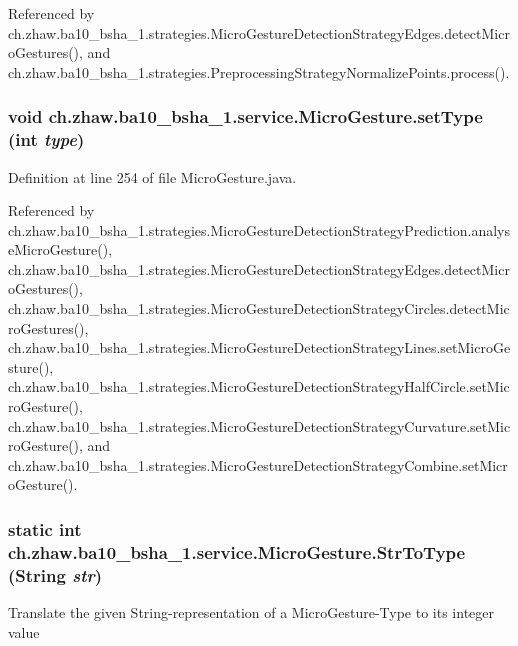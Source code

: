 Referenced by ch.zhaw.ba10\_\-bsha\_\-1.strategies.MicroGestureDetectionStrategyEdges.detectMicroGestures(), and ch.zhaw.ba10\_\-bsha\_\-1.strategies.PreprocessingStrategyNormalizePoints.process().\hypertarget{classch_1_1zhaw_1_1ba10__bsha__1_1_1service_1_1MicroGesture_ae7f33d544189f7cf99710d8694beec56}{
\subsubsection[{setType}]{\setlength{\rightskip}{0pt plus 5cm}void ch.zhaw.ba10\_\-bsha\_\-1.service.MicroGesture.setType (int {\em type})}}
\label{classch_1_1zhaw_1_1ba10__bsha__1_1_1service_1_1MicroGesture_ae7f33d544189f7cf99710d8694beec56}


Definition at line 254 of file MicroGesture.java.

Referenced by ch.zhaw.ba10\_\-bsha\_\-1.strategies.MicroGestureDetectionStrategyPrediction.analyseMicroGesture(), ch.zhaw.ba10\_\-bsha\_\-1.strategies.MicroGestureDetectionStrategyEdges.detectMicroGestures(), ch.zhaw.ba10\_\-bsha\_\-1.strategies.MicroGestureDetectionStrategyCircles.detectMicroGestures(), ch.zhaw.ba10\_\-bsha\_\-1.strategies.MicroGestureDetectionStrategyLines.setMicroGesture(), ch.zhaw.ba10\_\-bsha\_\-1.strategies.MicroGestureDetectionStrategyHalfCircle.setMicroGesture(), ch.zhaw.ba10\_\-bsha\_\-1.strategies.MicroGestureDetectionStrategyCurvature.setMicroGesture(), and ch.zhaw.ba10\_\-bsha\_\-1.strategies.MicroGestureDetectionStrategyCombine.setMicroGesture().\hypertarget{classch_1_1zhaw_1_1ba10__bsha__1_1_1service_1_1MicroGesture_ad0059e70f1b2eb1ec1876ece697bc871}{
\subsubsection[{StrToType}]{\setlength{\rightskip}{0pt plus 5cm}static int ch.zhaw.ba10\_\-bsha\_\-1.service.MicroGesture.StrToType (String {\em str})}}
\label{classch_1_1zhaw_1_1ba10__bsha__1_1_1service_1_1MicroGesture_ad0059e70f1b2eb1ec1876ece697bc871}
Translate the given String-\/representation of a MicroGesture-\/Type to its integer value


